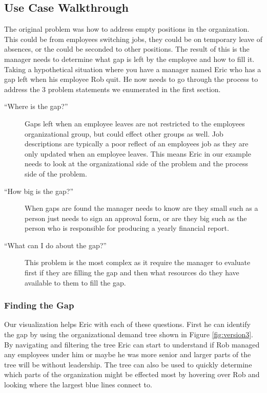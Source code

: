 \documentclass[journal]{vgtc}                %
\begin{document}
\subsection{Use Case Walkthrough}
The original problem was how to address empty positions in the organization.  This could be from employees switching jobs, they could be on temporary leave of absences, or the could be seconded to other positions.  The result of this is the manager needs to determine what gap is left by the employee and how to fill it.  Taking a hypothetical situation where you have a manager named Eric who has a gap left when his employee Rob quit.  He now needs to go through the process to address the 3 problem statements we enumerated in the first section.

\begin{description}
	\item [``Where is the gap?''] Gaps left when an employee leaves are not restricted to the employees organizational group, but could effect other groups as well.  Job descriptions are typically a poor reflect of an employees job as they are only updated when an employee leaves.  This means Eric in our example needs to look at the organizational side of the problem and the process side of the problem.
	\item [``How big is the gap?''] When gaps are found the manager needs to know are they small such as a person just needs to sign an approval form, or are they big such as the person who is responsible for producing a yearly financial report.

	\item [``What can I do about the gap?''] This problem is the most complex as it require the manager to evaluate first if they are filling the gap and then what resources do they have available to them to fill the gap.
\end{description}

\subsubsection{Finding the Gap}
Our visualization helps Eric with each of these questions.  First he can identify the gap by using the organizational demand tree shown in Figure \ref{fig:version3}.  By navigating and filtering the tree Eric can start to understand if Rob managed any employees under him or maybe he was more senior and larger parts of the tree will be without leadership.  The tree can also be used to quickly determine which parts of the organization might be effected most by hovering over Rob and looking where the largest blue lines connect to.
\end{document}
